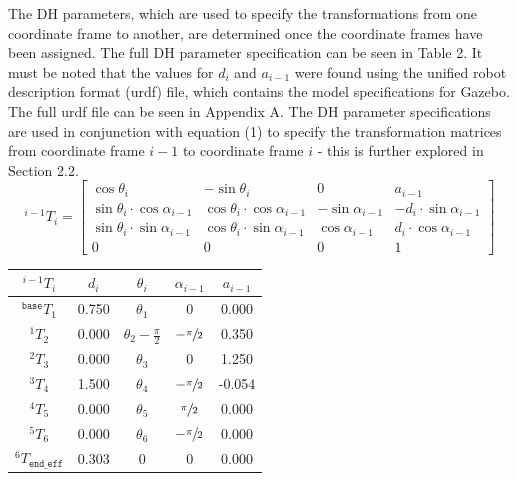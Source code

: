 \documentclass[a4paper]{article}
\begin{document}
The DH parameters, which are used to specify the transformations from one coordinate frame to another, are determined once the coordinate frames have been assigned. The full DH parameter specification can be seen in Table 2. It must be noted that the values for $d_i$ and $a_{i-1}$ were found using the unified robot description format (urdf) file, which contains the model specifications for Gazebo. The full urdf file can be seen in Appendix A. The DH parameter specifications are used in conjunction with equation (1) to specify the transformation matrices from coordinate frame $i-1$ to coordinate frame $i$ - this is further explored in Section 2.2.\\

\begin{equation}
	^{i-1} T_i =
	\begin{bmatrix}
	\cos \theta_i 							& -\sin \theta_i  							& 0 					& a_{i-1}\\
	\sin \theta_i \cdot \cos \alpha_{i-1}	& \cos \theta_i \cdot \cos \alpha_{i-1}		& -\sin \alpha_{i-1} 	& -d_i \cdot \sin \alpha_{i-1}\\
	\sin \theta_i \cdot \sin \alpha_{i-1}	& \cos \theta_i \cdot \sin \alpha_{i-1}		& \cos \alpha_{i-1}		& d_i \cdot \cos \alpha_{i-1}\\
	0										& 0											& 0						& 1
	\end{bmatrix}
\end{equation}

\begin{table}
\centering
{}
\begin{tabular}{ccccc}
\toprule
$^{i-1} T_i$ 				& $d_i$ 	& $\theta_i$ 					& $\alpha_{i-1}$ 	& $a_{i-1}$\\ 
\midrule
$^\texttt{base} T_1$ 		& 0.750 	& $\theta_1$ 					& 0 				& 0.000\\
$^1 T_2$ 					& 0.000 	& $\theta_2 - \frac{\pi}{2}$ 	& $-\sfrac{\pi}{2}$ & 0.350\\
$^2 T_3$ 					& 0.000 	& $\theta_3$ 					& 0 				& 1.250\\
$^3 T_4$ 					& 1.500 	& $\theta_4$ 					& $-\sfrac{\pi}{2}$ & -0.054\\
$^4 T_5$ 					& 0.000 	& $\theta_5$ 					& $\sfrac{\pi}{2}$ 	& 0.000\\
$^5 T_6$ 					& 0.000 	& $\theta_6$ 					& $-\sfrac{\pi}{2}$ & 0.000\\
$^6 T_\texttt{end\_eff}$ 	& 0.303 	& 0 							& 0 				& 0.000\\
\bottomrule
\end{tabular}
\end{table}
\end{document}
